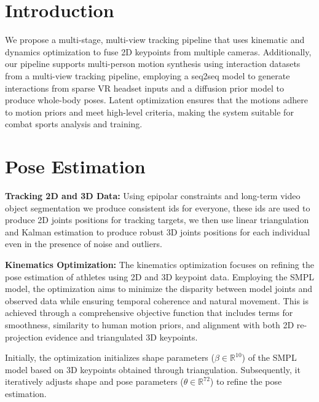 \documentclass{egpubl}
\begin{document}
\section{Introduction}
We propose a multi-stage, multi-view tracking pipeline that uses kinematic and dynamics optimization to fuse 2D keypoints from multiple cameras. Additionally, our pipeline supports multi-person motion synthesis using interaction datasets from a multi-view tracking pipeline, employing a seq2seq model to generate interactions from sparse VR headset inputs and a diffusion prior model to produce whole-body poses. Latent optimization ensures that the motions adhere to motion priors and meet high-level criteria, making the system suitable for combat sports analysis and training.
\section{Pose Estimation}

\textbf{Tracking 2D and 3D Data:} Using epipolar constraints and long-term video object segmentation we produce consistent ids for everyone, these ids are used to produce 2D joints positions for tracking targets, we then use linear triangulation and Kalman estimation to produce robust 3D joints positions for each individual even in the presence of noise and outliers.   

\textbf{Kinematics Optimization:} The kinematics optimization focuses on refining the pose estimation of athletes using 2D and 3D keypoint data. Employing the SMPL model, the optimization aims to minimize the disparity between model joints and observed data while ensuring temporal coherence and natural movement. This is achieved through a comprehensive objective function that includes terms for smoothness, similarity to human motion priors, and alignment with both 2D re-projection evidence and triangulated 3D keypoints.

Initially, the optimization initializes shape parameters ($\beta \in \mathbb{R}^{10}$) of the SMPL model based on 3D keypoints obtained through triangulation. Subsequently, it iteratively adjusts shape and pose parameters ($\theta \in \mathbb{R}^{72}$) to refine the pose estimation.
\end{document}

